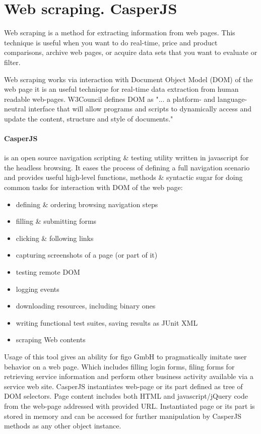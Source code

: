 \section{Web scraping. CasperJS}
Web scraping is a method for extracting information from web pages\cite{wikiScraping}. This technique is useful when you want to do real-time, price and product comparisons, archive web pages, or acquire data sets that you want to evaluate or filter\cite{conScrap}.

Web scraping works via interaction with Document Object Model (DOM) of the web page it is an useful technique for real-time data extraction from human readable web-pages. W3Council defines DOM\cite{w3cDOM} as "... a platform- and language-neutral interface that will allow programs and scripts to dynamically access and update the content, structure and style of documents." 

\paragraph{CasperJS} is an open source navigation scripting \& testing utility written in javascript for the headless browsing. It eases the process of defining a full navigation scenario and provides useful high-level functions, methods \& syntactic sugar for doing common tasks for interaction with DOM of the web page\cite{casperjs}:
\begin{itemize}
	\item defining \& ordering browsing navigation steps
	\item filling \& submitting forms
	\item clicking \& following links
	\item capturing screenshots of a page (or part of it)
	\item testing remote DOM
	\item logging events
	\item downloading resources, including binary ones
	\item writing functional test suites, saving results as JUnit XML
	\item scraping Web contents
\end{itemize}

Usage of this tool gives an ability for figo GmbH to pragmatically imitate user behavior on a web page. Which includes filling login forms, filing forms for retrieving service information and perform other business activity available via a service web site. CasperJS instantiates web-page or its part defined as tree of DOM selectors.  Page content includes both HTML and javascript/jQuery code from the web-page addressed with provided URL. Instantiated page or its part is stored in memory and can be accessed for further manipulation by CasperJS methods as any other object instance.
